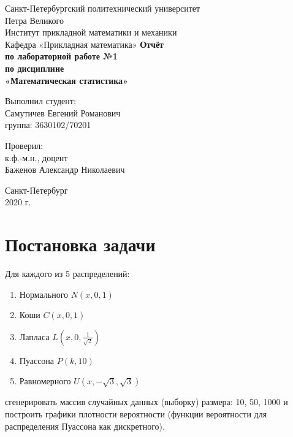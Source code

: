 \documentclass[12pt,a4paper]{article}
\begin{document}
	
\begin{titlepage}
	\begin{center}		
		\vfill	
		Санкт-Петербургский политехнический университет \\
		Петра Великого\\
		\vskip 1cm
		Институт прикладной математики и механики \\
		Кафедра «Прикладная математика»
		\vfill
		\textbf{Отчёт\\
			по лабораторной работе №1\\
			по дисциплине\\
			«Математическая статистика»\\}
		\vfill
	\end{center}
	\vfill
	\hfill
	\begin{minipage}{0.4\textwidth}
		Выполнил студент:\\
		Самутичев Евгений Романович\\
		группа: 3630102/70201\\
	\end{minipage}
	\vfill
	\hfill 
	\begin{minipage}{0.4\textwidth}
		Проверил:\\
		к.ф.-м.н., доцент\\
		Баженов Александр Николаевич\
	\end{minipage}
	\vfill
	\begin{center}
		Санкт-Петербург\\2020 г.
	\end{center}
\end{titlepage}

\tableofcontents
\pagebreak

\section{Постановка задачи}
Для каждого из 5 распределений:

\begin{enumerate}
	\item Нормального $N(x, 0, 1)$
	\item Коши $C(x, 0, 1)$
	\item Лапласа $L(x, 0, \frac{1}{\sqrt{2}})$
	\item Пуассона $P(k, 10)$
	\item Равномерного $U(x, -\sqrt{3}, \sqrt{3})$	
\end{enumerate}

сгенерировать массив случайных данных (выборку) размера: 10, 50, 1000 и построить графики плотности вероятности (функции вероятности для распределения Пуассона как дискретного).
\end{document}
